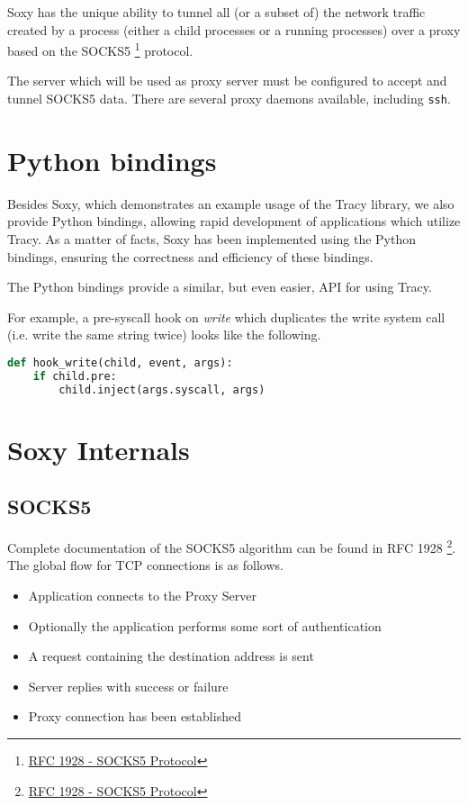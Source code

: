 \documentclass[a4paper, 10pt]{report}
\begin{document}
Soxy has the unique ability to tunnel all (or a subset of) the network traffic
created by a process (either a child processes or a running processes) over a
proxy based on the SOCKS5 \footnote{\href{http://www.ietf.org/rfc/rfc1928.txt}
{RFC 1928 - SOCKS5 Protocol}} protocol.

The server which will be used as proxy server must be configured to accept and
tunnel SOCKS5 data. There are several proxy daemons available, including
\verb=ssh=.

\section{Python bindings}


Besides Soxy, which demonstrates an example usage of the Tracy library, we
also provide Python bindings, allowing rapid development of applications
which utilize Tracy. As a matter of facts, Soxy has been implemented using the
Python bindings, ensuring the correctness and efficiency of these bindings.

The Python bindings provide a similar, but even easier, API for using Tracy.

For example, a pre-syscall hook on \textit{write} which duplicates the write
system call (i.e. write the same string twice) looks like the following.

\begin{lstlisting}[language=Python]
def hook_write(child, event, args):
    if child.pre:
        child.inject(args.syscall, args)
\end{lstlisting}

\section{Soxy Internals}

\subsection{SOCKS5}

Complete documentation of the SOCKS5 algorithm can be found in
RFC 1928 \footnote{\href{http://www.ietf.org/rfc/rfc1928.txt}
{RFC 1928 - SOCKS5 Protocol}}. The global flow for TCP connections
is as follows.

\begin{itemize}
\item Application connects to the Proxy Server
\item Optionally the application performs some sort of authentication
\item A request containing the destination address is sent
\item Server replies with success or failure
\item Proxy connection has been established
\end{itemize}
\end{document}
